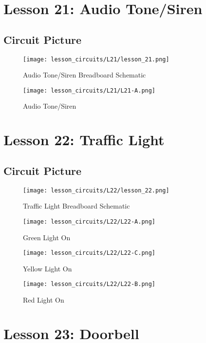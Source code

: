 \section{Lesson 21: Audio Tone/Siren}
\subsection{Circuit Picture}
\begin{figure}[htp]
    \centering
    \texttt{[image: lesson\_circuits/L21/lesson\_21.png]}
    \caption{Audio Tone/Siren Breadboard Schematic}
    \label{fig:555_audsi_sch}
\end{figure}
\begin{figure}[htp]
    \centering
    \texttt{[image: lesson\_circuits/L21/L21-A.png]}
    \caption{Audio Tone/Siren}
    \label{fig:555_audsi_obb}
\end{figure}
\section{Lesson 22: Traffic Light}
\subsection{Circuit Picture}
\begin{figure}[htp]
    \centering
    \texttt{[image: lesson\_circuits/L22/lesson\_22.png]}
    \caption{Traffic Light Breadboard Schematic}
    \label{fig:555_trlight_sch}
\end{figure}
\begin{figure}[htp]
    \centering
    \texttt{[image: lesson\_circuits/L22/L22-A.png]}
    \caption{Green Light On}
    \label{fig:555_trlight_obb}
\end{figure}
\begin{figure}[htp]
    \centering
    \texttt{[image: lesson\_circuits/L22/L22-C.png]}
    \caption{Yellow Light On}
    \label{fig:555_trlight_obb1}
\end{figure}
\begin{figure}[htp]
    \centering
    \texttt{[image: lesson\_circuits/L22/L22-B.png]}
    \caption{Red Light On}
    \label{fig:555_trlight_obb2}
\end{figure}
\section{Lesson 23: Doorbell}
